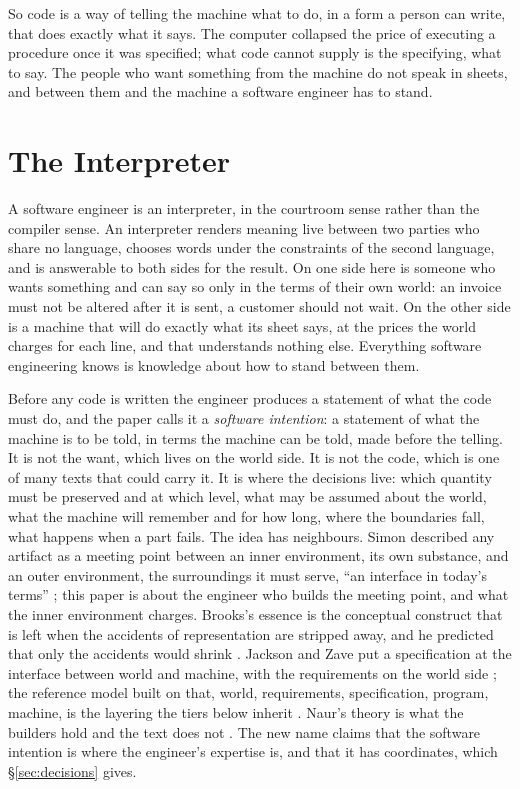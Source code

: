 \documentclass[11pt,oneside]{article}
\theoremstyle{definition}
\theoremstyle{remark}
\begin{document}
So code is a way of telling the machine what to do, in a form a person can write, that
does exactly what it says. The computer collapsed the price of executing a procedure once
it was specified; what code cannot supply is the specifying, what to say. The people who
want something from the machine do not speak in sheets, and between them and the machine
a software engineer has to stand.

\section{The Interpreter}\label{sec:interpreter}
A software engineer is an interpreter, in the courtroom sense rather than the compiler
sense. An interpreter renders meaning live between two parties who share no language,
chooses words under the constraints of the second language, and is answerable to both
sides for the result. On one side here is someone who wants something and can say so only
in the terms of their own world: an invoice must not be altered after it is sent, a
customer should not wait. On the other side is a machine that will do exactly what its
sheet says, at the prices the world charges for each line, and that understands nothing
else. Everything software engineering knows is knowledge about how to stand between them.

Before any code is written the engineer produces a statement of what the code must do,
and the paper calls it a \emph{software intention}: a statement of what the machine is to
be told, in terms the machine can be told, made before the telling. It is not the want,
which lives on the world side. It is not the code, which is one of many texts that could
carry it. It is where the decisions live: which quantity must be preserved and at which
level, what may be assumed about the world, what the machine will remember and for how
long, where the boundaries fall, what happens when a part fails. The idea has neighbours.
Simon described any artifact as a meeting point between an inner environment, its own
substance, and an outer environment, the surroundings it must serve, ``an interface in
today's terms'' \cite{simon1996}; this paper is about the engineer who builds the meeting
point, and what the inner environment charges. Brooks's essence is the conceptual
construct that is left when the accidents of representation are stripped away, and he
predicted that only the accidents would shrink \cite{brooks1987}. Jackson and Zave put a
specification at the interface between world and machine, with the requirements on the
world side \cite{zavejackson1997}; the reference model built on that, world, requirements,
specification, program, machine, is the layering the tiers below inherit \cite{gunter2000}.
Naur's theory is what the builders hold and the text does not \cite{naur1985}. The new
name claims that the software intention is where the engineer's expertise is, and that it
has coordinates, which \S\ref{sec:decisions} gives.
\end{document}
